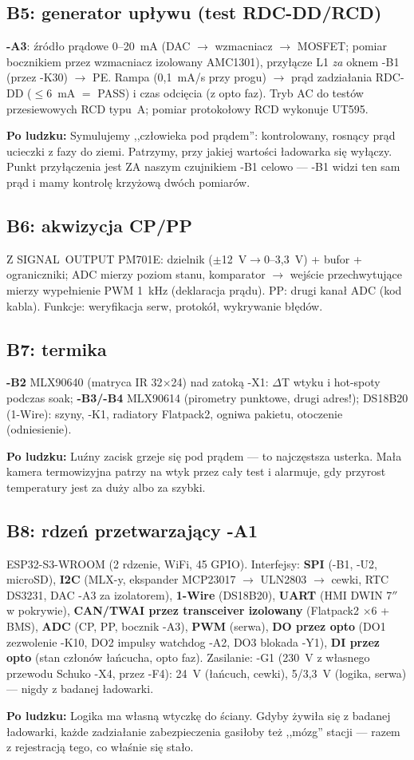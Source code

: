 \documentclass[11pt,a4paper]{article}
\newcommand{\why}[1]{\par\smallskip\noindent\colorbox{blue!6}{\parbox{0.965\linewidth}{\small\textbf{Po ludzku:} #1}}\par\smallskip}
\begin{document}
\subsection{B5: generator upływu (test RDC-DD/RCD)}
\textbf{-A3}: źródło prądowe 0--20~mA (DAC $\to$ wzmacniacz $\to$ MOSFET; pomiar bocznikiem przez
wzmacniacz izolowany AMC1301), przyłącze L1 \emph{za} oknem -B1 (przez -K30) $\to$ PE. Rampa
(0,1~mA/s przy progu) $\to$ prąd zadziałania RDC-DD ($\le$6~mA $=$ PASS) i czas odcięcia (z opto
faz). Tryb AC do testów przesiewowych RCD typu~A; pomiar protokołowy RCD wykonuje UT595.
\why{Symulujemy ,,człowieka pod prądem'': kontrolowany, rosnący prąd ucieczki z fazy do ziemi.
Patrzymy, przy jakiej wartości ładowarka się wyłączy. Punkt przyłączenia jest ZA naszym
czujnikiem -B1 celowo --- -B1 widzi ten sam prąd i mamy kontrolę krzyżową dwóch pomiarów.}
\subsection{B6: akwizycja CP/PP}
Z SIGNAL~OUTPUT PM701E: dzielnik ($\pm$12~V$\to$0--3,3~V) + bufor + ograniczniki; ADC mierzy
poziom stanu, komparator $\to$ wejście przechwytujące mierzy wypełnienie PWM 1~kHz (deklaracja
prądu). PP: drugi kanał ADC (kod kabla). Funkcje: weryfikacja serw, protokół, wykrywanie błędów.
\subsection{B7: termika}
\textbf{-B2} MLX90640 (matryca IR 32$\times$24) nad zatoką -X1: $\Delta$T wtyku i hot-spoty
podczas soak; \textbf{-B3/-B4} MLX90614 (pirometry punktowe, drugi adres!); DS18B20 (1-Wire):
szyny, -K1, radiatory Flatpack2, ogniwa pakietu, otoczenie (odniesienie).
\why{Luźny zacisk grzeje się pod prądem --- to najczęstsza usterka. Mała kamera termowizyjna
patrzy na wtyk przez cały test i alarmuje, gdy przyrost temperatury jest za duży albo za szybki.}
\subsection{B8: rdzeń przetwarzający -A1}
ESP32-S3-WROOM (2 rdzenie, WiFi, 45 GPIO). Interfejsy: \textbf{SPI} (-B1, -U2, microSD),
\textbf{I2C} (MLX-y, ekspander MCP23017 $\to$ ULN2803 $\to$ cewki, RTC DS3231, DAC -A3 za
izolatorem), \textbf{1-Wire} (DS18B20), \textbf{UART} (HMI DWIN 7$''$ w pokrywie), \textbf{CAN/TWAI
przez transceiver izolowany} (Flatpack2 $\times$6 + BMS), \textbf{ADC} (CP, PP, bocznik -A3),
\textbf{PWM} (serwa), \textbf{DO przez opto} (DO1 zezwolenie -K10, DO2 impulsy watchdog -A2,
DO3 blokada -Y1), \textbf{DI przez opto} (stan członów łańcucha, opto faz). Zasilanie: -G1
(230~V z własnego przewodu Schuko -X4, przez -F4): 24~V (łańcuch, cewki), 5/3,3~V (logika, serwa)
--- nigdy z badanej ładowarki.
\why{Logika ma własną wtyczkę do ściany. Gdyby żywiła się z badanej ładowarki, każde zadziałanie
zabezpieczenia gasiłoby też ,,mózg'' stacji --- razem z rejestracją tego, co właśnie się stało.}
\end{document}

